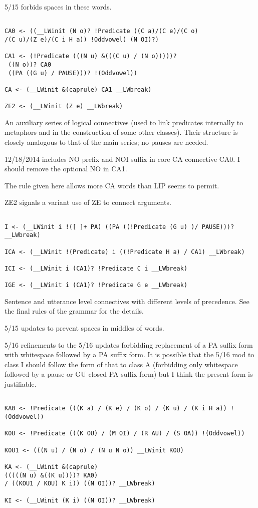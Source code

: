 \documentclass[12pt]{article}
\begin{document}
5/15 forbids spaces in these words.

\begin{verbatim}

CA0 <- ((__LWinit (N o)? !Predicate ((C a)/(C e)/(C o)
/(C u)/(Z e)/(C i H a)) !Oddvowel) (N OI)?)

CA1 <- (!Predicate (((N u) &(((C u) / (N o)))))?
 ((N o))? CA0 
 ((PA ((G u) / PAUSE)))? !(Oddvowel))

CA <- (__LWinit &(caprule) CA1 __LWbreak)

ZE2 <- (__LWinit (Z e) __LWbreak)

\end{verbatim}

An auxiliary series of logical connectives (used to link predicates internally to metaphors and in the construction of some other classes).  Their structure is closely analogous to that of the main series; no pauses are needed.

12/18/2014  includes NO prefix and NOI suffix in core CA connective CA0.  I should remove the optional NO in CA1.

The rule given here allows more CA words than LIP seems to permit.

ZE2 signals a variant use of ZE to connect arguments.

\begin{verbatim}

I <- (__LWinit i !([ ]+ PA) ((PA ((!Predicate (G u) )/ PAUSE)))? __LWbreak)

ICA <- (__LWinit !(Predicate) i ((!Predicate H a) / CA1) __LWbreak)

ICI <- (__LWinit i (CA1)? !Predicate C i __LWbreak)

IGE <- (__LWinit i (CA1)? !Predicate G e __LWbreak)

\end{verbatim}

Sentence and utterance level connectives with different levels of precedence.  See the final rules of the grammar for the details.

5/15 updates to prevent spaces in middles of words.

5/16 refinements to the 5/16 updates forbidding replacement of a PA suffix form with whitespace followed by a PA suffix form.   It is 
possible that the 5/16 mod to class I should follow the form of that to class A (forbidding only whitespace followed by a pause or GU closed
PA suffix form) but I think the present form is justifiable.

\begin{verbatim}

KA0 <- !Predicate (((K a) / (K e) / (K o) / (K u) / (K i H a)) !(Oddvowel))

KOU <- !Predicate (((K OU) / (M OI) / (R AU) / (S OA)) !(Oddvowel))

KOU1 <- (((N u) / (N o) / (N u N o)) __LWinit KOU)

KA <- (__LWinit &(caprule) 
(((((N u) &((K u))))? KA0) 
/ ((KOU1 / KOU) K i)) ((N OI))? __LWbreak)

KI <- (__LWinit (K i) ((N OI))? __LWbreak)

\end{verbatim}
\end{document}
